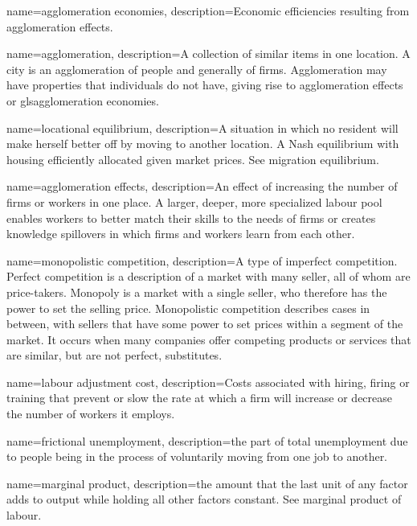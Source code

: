 {
name=agglomeration economies,
description={Economic efficiencies resulting from \gls{agglomeration effects}.}
}

{
name=agglomeration,
description={A collection of similar items in one location. A city is an agglomeration of people and generally of firms. Agglomeration may have properties that individuals do not have, giving rise to \gls{agglomeration effects} or gls{agglomeration economies}.}
}

{
name=locational equilibrium,
description={A situation in which no resident will make herself better off by moving to another location. A Nash equilibrium with housing efficiently allocated  given market prices. See \gls{migration equilibrium}.}
}

{
name=agglomeration effects,
description={An effect of increasing the number of firms  or workers in one place. A larger, deeper, more specialized labour pool enables workers to better match their skills to the needs of firms or creates knowledge spillovers in which firms and workers learn from each other.}
}

{
name=monopolistic competition,
description={A type of  \gls{imperfect competition}. \gls{Perfect competition} is a description of a market with many seller, all of whom are price-takers. Monopoly is a market with a single seller, who therefore has the power to set the selling price. Monopolistic competition describes cases in between, with sellers that have some power to set prices within a segment of the market. It occurs when many companies offer competing products or services that are similar, but are not perfect, substitutes.}
}

{
name=labour adjustment cost,
description={Costs associated with hiring, firing or training that prevent or slow the rate at which a firm will increase or decrease the number of workers it employs.}
}

{
name=frictional unemployment,
description={the part of total unemployment  due to people being in the process of voluntarily moving from one job to another.}
}

{
name=marginal product,
description={the amount that the last unit of any factor  adds to output while holding all other factors constant. See \gls{marginal product of labour}.}
}

